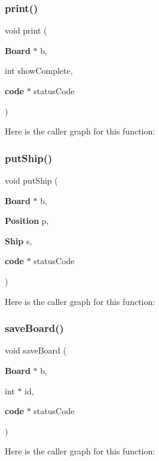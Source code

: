 \subsubsection{print()}
{\footnotesize\ttfamily void print (\begin{DoxyParamCaption}\item[{{\bf Board} $\ast$}]{b,  }\item[{int}]{show\+Complete,  }\item[{{\bf code} $\ast$}]{status\+Code }\end{DoxyParamCaption})}

Here is the caller graph for this function\+:
\label{funciones_8c_a601ceec2c364cd451fa0743194104a99} 
\subsubsection{put\+Ship()}
{\footnotesize\ttfamily void put\+Ship (\begin{DoxyParamCaption}\item[{{\bf Board} $\ast$}]{b,  }\item[{{\bf Position}}]{p,  }\item[{{\bf Ship}}]{s,  }\item[{{\bf code} $\ast$}]{status\+Code }\end{DoxyParamCaption})}

Here is the caller graph for this function\+:
\label{funciones_8c_a61cc12ef0ad979f7dbd81c62f0bfffd8} 
\subsubsection{save\+Board()}
{\footnotesize\ttfamily void save\+Board (\begin{DoxyParamCaption}\item[{{\bf Board} $\ast$}]{b,  }\item[{int $\ast$}]{id,  }\item[{{\bf code} $\ast$}]{status\+Code }\end{DoxyParamCaption})}

Here is the caller graph for this function\+:
\label{funciones_8c_a1c6878523e5a0460bdac9b23b0266c12} 

